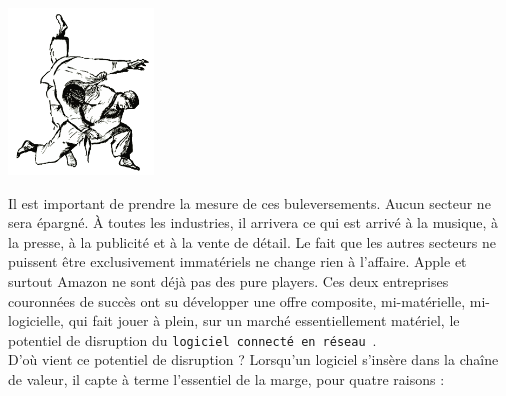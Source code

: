 \documentclass[11pt,twoside,a4paper]{article}
\begin{document}
\begin{minipage}[h]{4.00cm}
	\includegraphics[width=3.85cm]{img/taiotoshi.png}
\end{minipage} \hfill \begin{minipage}[h]{15cm}
	Il est important de prendre la mesure de ces buleversements. Aucun secteur ne sera {\'e}pargn{\'e}. {\`A} toutes les industries, il arrivera ce qui est arriv{\'e} {\`a} la musique, {\`a} la presse, {\`a} la publicit{\'e} et {\`a} la vente de d{\'e}tail. Le fait que les autres secteurs ne puissent {\^e}tre exclusivement immat{\'e}riels ne change rien {\`a} l'affaire. Apple et surtout Amazon ne sont d{\'e}j{\`a} pas des pure players. Ces deux entreprises couronn{\'e}es de succ{\`e}s ont su d{\'e}velopper une offre composite, mi-mat{\'e}rielle, mi-logicielle, qui fait jouer {\`a} plein, sur un march{\'e} essentiellement mat{\'e}riel, le potentiel de disruption du \texttt{logiciel connect{\'e} en r{\'e}seau}~\footnotemark. ~\\
	
	D'o{\`u} vient ce potentiel de disruption ? Lorsqu'un logiciel s'ins{\`e}re dans la cha{\^i}ne de valeur, il capte {\`a} terme l'essentiel de la marge, pour quatre raisons :
\end{minipage}
\setlength\parindent{15pt}
\end{document}
